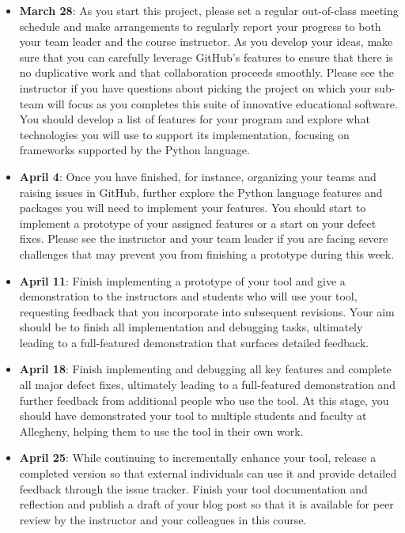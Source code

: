 \documentclass[11pt]{article}
\begin{document}
\begin{itemize}

  \setlength{\itemsep}{0pt}

  \item {\bf March 28}: As you start this project, please set a regular
    out-of-class meeting schedule and make arrangements to regularly report your
    progress to both your team leader and the course instructor. As you develop
    your ideas, make sure that you can carefully leverage GitHub's features to
    ensure that there is no duplicative work and that collaboration proceeds
    smoothly. Please see the instructor if you have questions about picking the
    project on which your sub-team will focus as you completes this suite of
    innovative educational software.
    You should develop a list of features for your program and explore what
    technologies you will use to support its implementation, focusing on
    frameworks supported by the Python language.

  \item {\bf April 4}: Once you have finished, for instance, organizing your
    teams and raising issues in GitHub, further explore the Python language
    features and packages you will need to implement your features. You should
    start to implement a prototype of your assigned features or a start on your
    defect fixes. Please see the instructor and your team leader if you are
    facing severe challenges that may prevent you from finishing a prototype
    during this week.

  \item {\bf April 11}: Finish implementing a prototype of your tool and give
    a demonstration to the instructors and students who will use your tool,
    requesting feedback that you incorporate into subsequent revisions. Your aim
    should be to finish all implementation and debugging tasks, ultimately
    leading to a full-featured demonstration that surfaces detailed feedback.

  \item {\bf April 18}: Finish implementing and debugging all key features and
    complete all major defect fixes, ultimately leading to a full-featured
    demonstration and further feedback from additional people who use the tool.
    At this stage, you should have demonstrated your tool to multiple students
    and faculty at Allegheny, helping them to use the tool in their own work.

  \item {\bf April 25}: While continuing to incrementally enhance your tool,
    release a completed version so that external individuals can use it and
    provide detailed feedback through the issue tracker. Finish your tool
    documentation and reflection and publish a draft of your blog post so that
    it is available for peer review by the instructor and your colleagues in
    this course.


\end{itemize}
\end{document}
